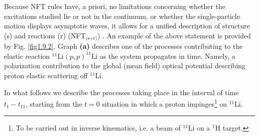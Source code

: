  Because NFT rules have, a priori,  no limitations concerning whether the excitations studied lie or not in the continuum, or whether the single-particle motion displays asymptotic waves, it allows for a unified description of structure (s) and reactions (r) (NFT$_{\text{(s+r)}}$) . An example of the above statement is provided by Fig. \ref{fig1.9.2}. Graph \textbf{(a)} describes  one of the processes contributing to the elastic
reaction $^{11}$Li$(p,p)^{11}$Li as the system propagates in time. Namely, a polarization contribution to
the global (mean field) optical potential describing proton elastic scattering off $^{11}$Li. 


In what follows we describe the processes taking place  in the interval of time $t_1-t_{11}$, starting from the $t=0$ situation in which a proton impinges\footnote{To be carried out in inverse kinematics, i.e. a beam of $^{11}$Li on a $^1$H target.} on $^{11}$Li.


